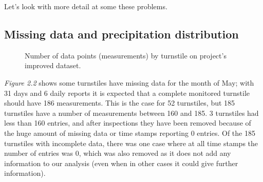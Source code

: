 \documentclass[letterpaper,10pt,english]{sphinxmanual}
\begin{document}
Let's look with more detail at some these problems.


\subsection{Missing data and precipitation distribution}
\label{section1:missing-data-and-precipitation-distribution}\begin{figure}[htbp]
\centering
\capstart

\caption{Number of data points (measurements) by turnstile on project's improved
dataset.}\label{section1:figure22}\end{figure}

\emph{Figure 2.2} shows some turnstiles have missing data for the
month of May; with 31 days and 6 daily reports it is expected that a complete
monitored turnstile should have 186 measurements. This is the case for 52 turnstiles,
but 185 turnstiles have a number of measurements between 160 and 185. 3 turnstiles
had less than 160 entries, and after inspections they have been removed because
of the huge amount of missing data or time stamps reporting 0 entries. Of the 185
turnstiles with incomplete data, there was one case where at all time stamps the
number of entries was 0, which was also removed as it does not add any information
to our analysis (even when in other cases it could give further information).
\end{document}
